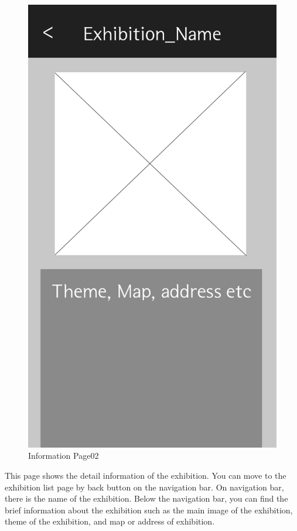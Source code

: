 \documentclass[conference]{IEEEtran}
\begin{document}
\begin{figure}[htbp]
\begin{center}
    \includegraphics[scale=0.15]{img_infoDetail}
    \caption{Information Page02} 
\end{center}
\end{figure}


This page shows the detail information of the exhibition. You can move to the exhibition list page by back button on the navigation bar. On navigation bar, there is the name of the exhibition. Below the navigation bar, you can find the brief information about the exhibition such as the main image of the exhibition, theme of the exhibition, and map or address of exhibition. \\\\\\
\end{document}
